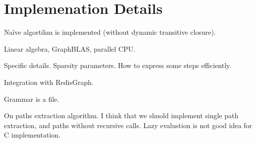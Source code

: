\section{Implemenation Details}

Na{\"i}ve algortihm is implemented (without dynamic transitive closure).

Linear algebra, GraphBLAS, parallel CPU.

Specific details. Sparsity parameters. How to express some steps efficiently.

Integration with RedisGraph.

Grammar is a file.

On paths extraction algorithm. I think that we shuold implement single path extraction, and paths without recursive calls. Lazy evalustion is not good idea for C implementation.